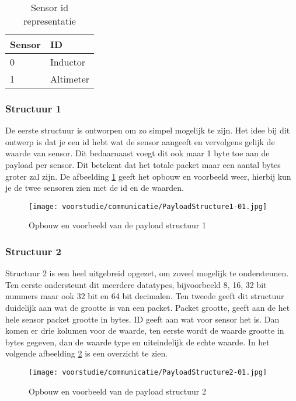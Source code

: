 \begin{table}[h!]
	\centering
	\caption{Sensor id representatie}
	\label{tab:SensorRep}
	\begin{tabular}{p{2cm}p{6cm}}
	\toprule
	Sensor & ID        \\ \midrule
	0      & Inductor  \\
	1      & Altimeter \\ \bottomrule
	\end{tabular}%
\end{table}

\newpage
\subsubsection{Structuur 1}
De eerste structuur is ontworpen om zo simpel mogelijk te zijn. Het idee bij dit ontwerp is dat je een id hebt wat de sensor aangeeft en vervolgens gelijk de waarde van sensor. Dit bedaarnaast voegt dit ook maar 1 byte toe aan de payload per sensor. Dit betekent dat het totale packet maar een aantal bytes groter zal zijn. De afbeelding \ref{fig:Structure1} geeft het opbouw en voorbeeld weer, hierbij kun je de twee sensoren zien met de id en de waarden.
\begin{figure}[h!]
	\centering
	\label{fig:Structure1}

	\caption{Opbouw en voorbeeld van de payload structuur 1}
	\texttt{[image: voorstudie/communicatie/PayloadStructure1-01.jpg]}
\end{figure}

\subsubsection{Structuur 2}
Structuur 2 is een heel uitgebreid opgezet, om zoveel mogelijk te ondersteunen. Ten eerste ondersteunt dit meerdere datatypes, bijvoorbeeld 8, 16, 32 bit nummers maar ook 32 bit en 64 bit decimalen. Ten tweede geeft dit structuur duidelijk aan wat de grootte is van een packet. Packet grootte, geeft aan de het hele sensor packet grootte in bytes. ID geeft aan wat voor sensor het is. Dan komen er drie kolumen voor de waarde, ten eerste wordt de waarde grootte in bytes gegeven, dan de waarde type en uiteindelijk de echte waarde. In het volgende afbeelding \ref{fig:Structure2} is een overzicht te zien.
\begin{figure}[h!]
	\centering
	\label{fig:Structure2}
	\caption{Opbouw en voorbeeld van de payload structuur 2}
	\texttt{[image: voorstudie/communicatie/PayloadStructure2-01.jpg]}
\end{figure}

